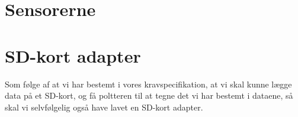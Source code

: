 \section{Sensorerne}



\section{SD-kort adapter}
Som følge af at vi har bestemt i vores kravspecifikation, at vi skal
kunne lægge data på et SD-kort, og få poltteren til at tegne det vi
har bestemt i dataene, så skal vi selvfølgelig også have lavet en
SD-kort adapter.

